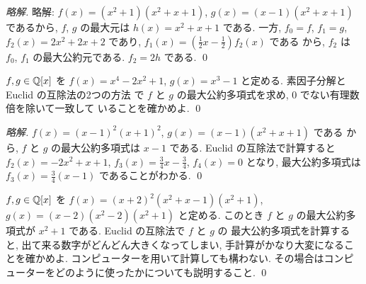 \documentclass[12pt,twoside]{jarticle}
\newcommand\commentout[1]{#1}
\newcommand\commentout[1]{}
\begin{document}
\commentout{
\begin{proof}[略解]
略解: $f(x)=(x^2+1)(x^2+x+1)$, 
$g(x)=(x-1)(x^2+x+1)$ であるから,
$f$, $g$ の最大元は $h(x)=x^2+x+1$ である.
一方, $f_0=f$, $f_1=g$, $f_2(x)=2x^2+2x+2$ であり, 
$f_1(x)=(\frac{1}{2}x-\frac{1}{2})f_2(x)$ である
から, $f_2$ は $f_0$, $f_1$ の最大公約元である.
$f_2=2h$ である.
\qed
\end{proof}
}


\begin{question}[3点]
\label{q:E-a-1}
  $f,g\in{\mathbb Q}[x]$ を $f(x)=x^4 - 2x^2 + 1$, $g(x)=x^3 - 1$ と定める.
  素因子分解と Euclid の互除法の2つの方法
  で $f$ と $g$ の最大公約多項式を求め, $0$ でない有理数倍を除いて一致して
  いることを確かめよ.
  \qed
\end{question}

\commentout{
\begin{proof}[略解]
$f(x)=(x-1)^2(x+1)^2$, $g(x)=(x-1)(x^2+x+1)$ である
から, $f$ と $g$ の最大公約多項式は $x-1$ である.  
Euclid の互除法で計算すると $f_2(x)=-2x^2+x+1$,
$f_3(x)=\frac{3}{4}x-\frac{3}{4}$, $f_4(x)=0$ となり, 
最大公約多項式は $f_3(x)=\frac{3}{4}(x-1)$ であることがわかる.
\qed
\end{proof}
}


\begin{question}
\label{q:E-a-2}
  $f,g\in{\mathbb Q}[x]$ を $f(x) = (x+2)^2(x^2+x-1)(x^2+1)$,
  $g(x) = (x-2)(x^2-2)(x^2+1)$ と定める.
  このとき $f$ と $g$ の最大公約多項式が $x^2+1$ である.
  Euclid の互除法で $f$ と $g$ の
  最大公約多項式を計算すると, 出て来る数字がどんどん大きくなってしまい, 
  手計算がかなり大変になることを確かめよ.
  コンピューターを用いて計算しても構わない. 
  その場合はコンピューターをどのように使ったかについても説明すること.
  \qed
\end{question}
\end{document}
